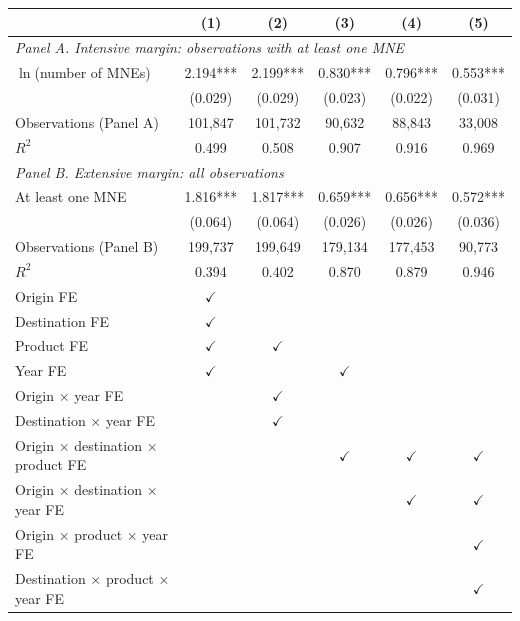\begin{tabular}{l*{5}{c}}
\toprule
 & (1) & (2) & (3) & (4) & (5) \\
\midrule
\multicolumn{6}{l}{\textit{Panel A. Intensive margin: observations with at least one MNE}} \\
$\ln$(number of MNEs) & 2.194*** & 2.199*** & 0.830*** & 0.796*** & 0.553*** \\
 & (0.029) & (0.029) & (0.023) & (0.022) & (0.031) \\
Observations (Panel A) & 101,847 & 101,732 & 90,632 & 88,843 & 33,008 \\
$R^2$ & 0.499 & 0.508 & 0.907 & 0.916 & 0.969 \\
\midrule
\multicolumn{6}{l}{\textit{Panel B. Extensive margin: all observations}} \\
At least one MNE & 1.816*** & 1.817*** & 0.659*** & 0.656*** & 0.572*** \\
 & (0.064) & (0.064) & (0.026) & (0.026) & (0.036) \\
Observations (Panel B) & 199,737 & 199,649 & 179,134 & 177,453 & 90,773 \\
$R^2$ & 0.394 & 0.402 & 0.870 & 0.879 & 0.946 \\
\midrule
Origin FE & $\checkmark$ &  &  &  &  \\
Destination FE & $\checkmark$ &  &  &  &  \\
Product FE & $\checkmark$ & $\checkmark$ &  &  &  \\
Year FE & $\checkmark$ &  & $\checkmark$ &  &  \\
Origin $\times$ year FE &  & $\checkmark$ &  &  &  \\
Destination $\times$ year FE &  & $\checkmark$ &  &  &  \\
Origin $\times$ destination $\times$ product FE &  &  & $\checkmark$ & $\checkmark$ & $\checkmark$ \\
Origin $\times$ destination $\times$ year FE &  &  &  & $\checkmark$ & $\checkmark$ \\
Origin $\times$ product $\times$ year FE &  &  &  &  & $\checkmark$ \\
Destination $\times$ product $\times$ year FE &  &  &  &  & $\checkmark$ \\
\bottomrule
\end{tabular}
